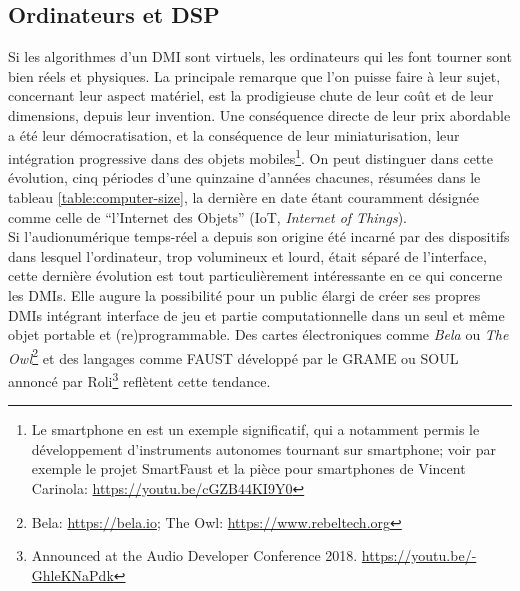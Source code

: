 \subsection{Ordinateurs et DSP}

\noindent Si les algorithmes d'un \gls{DMI} sont virtuels, les ordinateurs qui les font tourner sont bien réels et physiques. La principale remarque que l'on puisse faire à leur sujet, concernant leur aspect matériel, est la prodigieuse chute de leur coût et de leur dimensions, depuis leur invention. Une conséquence directe de leur prix abordable a été leur démocratisation, et la conséquence de leur miniaturisation, leur intégration progressive dans des objets mobiles\footnote{Le smartphone en est un exemple significatif, qui a notamment permis le développement d'instruments autonomes tournant sur smartphone; voir par exemple le projet SmartFaust et la pièce pour smartphones de Vincent Carinola: \url{https://youtu.be/cGZB44KI9Y0}}. On peut distinguer dans cette évolution, cinq périodes d'une quinzaine d'années chacunes, résumées dans le tableau \ref{table:computer-size}, la dernière en date étant couramment désignée comme celle de ``l'Internet des Objets'' (IoT, \textit{Internet of Things}).\\
\indent Si l'audionumérique temps-réel a depuis son origine été incarné par des dispositifs dans lesquel l'ordinateur, trop volumineux et lourd, était séparé de l'interface, cette dernière évolution est tout particulièrement intéressante en ce qui concerne les \glspl{DMI}. Elle augure la possibilité pour un public élargi de créer ses propres \glspl{DMI} intégrant interface de jeu et partie computationnelle dans un seul et même objet portable et (re)programmable. Des cartes électroniques comme \textit{Bela} ou \textit{The Owl}\footnote{Bela: \url{https://bela.io}; The Owl: \url{https://www.rebeltech.org}} et des langages comme \gls{FAUST} développé par le \gls{GRAME} \cite{orlarey_faust_2008} ou SOUL annoncé par Roli\footnote{Announced at the Audio Developer Conference 2018. \url{https://youtu.be/-GhleKNaPdk}} reflètent cette tendance.

